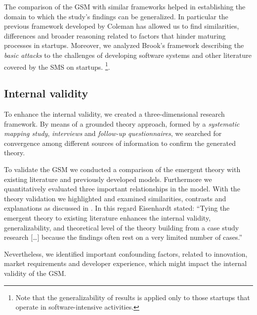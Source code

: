 \documentclass[10pt,journal,letterpaper,compsoc]{IEEEtran}
\begin{document}
The comparison of the GSM with similar frameworks helped in establishing the 
domain to which the study's findings can be generalized. In particular the 
previous framework developed by Coleman \cite{Coleman2008} has allowed 
us to find similarities, differences and broader reasoning related to 
factors that hinder maturing processes in startups. Moreover, we analyzed 
Brook's framework describing the \textit{basic attacks} to the challenges of 
developing software systems and other literature covered by the SMS on startups.
\cite{SMS}\footnote{Note that the generalizability of results is applied only to 
those startups that operate in software-intensive activities.}. 

\subsection{Internal validity}
To enhance the internal validity, we created a three-dimensional research 
framework. By means of a grounded theory approach, formed by a 
\textit{systematic mapping study}, \textit{interviews} and \textit{follow-up 
questionnaires}, we searched for convergence among different sources of 
information to confirm the generated theory.

To validate the GSM we conducted a comparison of the emergent theory with 
existing literature and previously developed models. Furthermore we 
quantitatively evaluated three important relationships in the model. With the 
theory validation we highlighted and examined similarities, contrasts and 
explanations as discussed in \cite{Eisenhardt2007}. In this regard Eisenhardt 
stated: ``Tying the emergent theory to existing literature enhances the internal 
validity, generalizability, and theoretical level of the theory building from 
a case study research [\ldots] because the findings often rest on a very limited 
number of cases.''

Nevertheless, we identified important confounding factors, related to 
innovation, market requirements and developer experience, which might 
impact the internal validity of the GSM.
\end{document}
